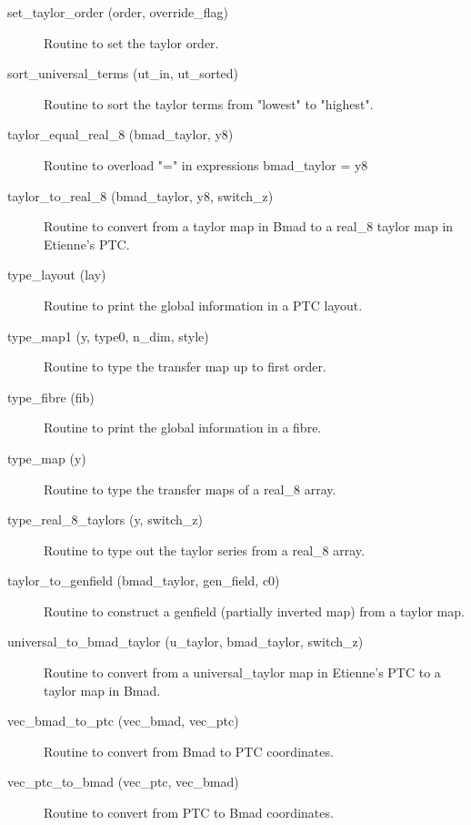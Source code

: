 \begin{description}
\item[set_taylor_order (order, override_flag)] \Newline
Routine to set the taylor order. 

\label{r:sort.universal.terms}
\item[sort_universal_terms (ut_in, ut_sorted)] \Newline
Routine to sort the taylor terms from "lowest" to "highest". 

\label{r:taylor.equal.real.8}
\item[taylor_equal_real_8 (bmad_taylor, y8)] \Newline
Routine to overload "=" in expressions bmad_taylor = y8 

\label{r:taylor.to.real.8}
\item[taylor_to_real_8 (bmad_taylor, y8, switch_z)] \Newline
Routine to convert from a taylor map in Bmad to a real_8 taylor map in Etienne's PTC. 

\label{r:type.layout}
\item[type_layout (lay)] \Newline
Routine to print the global information in a PTC layout.

\label{r:type.map1}
\item[type_map1 (y, type0, n_dim, style)] \Newline
Routine to type the transfer map up to first order. 

\label{r:type.fibre}
\item[type_fibre (fib)] \Newline
Routine to print the global information in a fibre.

\label{r:type.map}
\item[type_map (y)] \Newline
Routine to type the transfer maps of a real_8 array. 

\label{r:type.real.8.taylors}
\item[type_real_8_taylors (y, switch_z)] \Newline
Routine to type out the taylor series from a real_8 array. 

\label{r:taylor.to.genfield}
\item[taylor_to_genfield (bmad_taylor, gen_field, c0)] \Newline
Routine to construct a genfield (partially inverted map) from a taylor map. 

\label{r:universal.to.bmad.taylor}
\item[universal_to_bmad_taylor (u_taylor, bmad_taylor, switch_z)] \Newline
Routine to convert from a universal_taylor map in Etienne's PTC to a taylor map in Bmad. 

\label{r:vec.bmad.to.ptc}
\item[vec_bmad_to_ptc (vec_bmad, vec_ptc)] \Newline
Routine to convert from Bmad to PTC coordinates. 

\label{r:vec.ptc.to.bmad}
\item[vec_ptc_to_bmad (vec_ptc, vec_bmad)] \Newline
Routine to convert from PTC to Bmad coordinates. 

\end{description}

